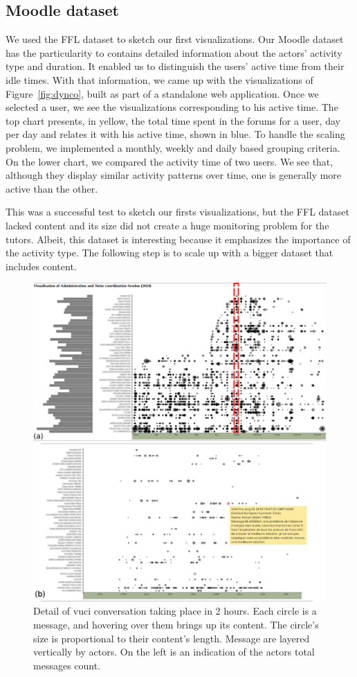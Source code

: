 \documentclass[a4paper,twoside]{article}
\begin{document}
\subsection{Moodle dataset}
We used the FFL dataset to sketch our first visualizations.  Our Moodle dataset has the particularity to contains detailed information about the actors' activity type and duration.  It enabled us to distinguish the users' active time from their idle times.  With that information, we came up with the visualizations of Figure~\ref{fig:dynco}, built as part of a standalone web application.  Once we selected a user, we see the visualizations corresponding to his active time.   The top chart presents, in yellow, the total time spent in the forums for a user, day per day and relates it with his active time, shown in blue.  To handle the scaling problem, we implemented a monthly, weekly and daily based grouping criteria.  On the lower chart, we compared the activity time of two users.  We see that, although they display similar activity patterns over time, one is generally more active than the other.

This was a successful test to sketch our firsts visualizations, but the FFL dataset lacked content and its size did not create a huge monitoring problem for the tutors.  Albeit, this dataset is interesting because it emphasizes the importance of the activity type.  The following step is to scale up with a bigger dataset that includes content.

\begin{figure}[t]
 \centering
 \includegraphics[width=.5\textwidth]{images/uvci_portrait}
 \small{
  \caption{\label{fig:hgconv}
   Detail of \gls{vuci} conversation taking place in 2 hours.  Each circle is a message, and hovering over them brings up its content.  The circle's size is proportional to their content's length.  Message are layered vertically by actors.  On the left is an indication of the actors total messages count.
  }}
\end{figure}
\end{document}
